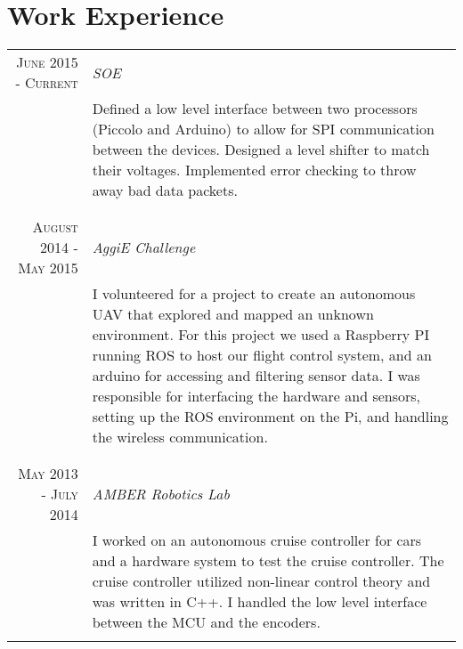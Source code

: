 \documentclass[a4paper,10pt]{article} %
\begin{document}
\section{Work Experience}

\begin{tabular}{r|p{11cm}}
\textsc{June 2015 - Current} & \emph{SOE}\\
& \footnotesize{Defined a low level interface between two processors (Piccolo and Arduino) to allow for SPI communication between the devices. Designed a level shifter to match their voltages. Implemented error checking to throw away bad data packets.}\\
\multicolumn{2}{c}{} \\
& \\

\textsc{August 2014 - May 2015} & \emph{AggiE Challenge}\\
& \footnotesize{I volunteered for a project to create an autonomous UAV that explored and mapped an unknown environment. For this project we used a Raspberry PI running ROS to host our flight control system, and an arduino for accessing and filtering sensor data. I was responsible for interfacing the hardware and sensors, setting up the ROS environment on the Pi, and handling the wireless communication.}\\
\multicolumn{2}{c}{} \\
& \\

\textsc{May 2013 - July 2014} & \emph{AMBER Robotics Lab}\\
& \footnotesize{I worked on an autonomous cruise controller for cars and a hardware system to test the cruise controller. The cruise controller utilized non-linear control theory and was written in C++. I handled the low level interface between the MCU and the encoders.}\\
\multicolumn{2}{c}{} \\

\end{tabular}




\end{document}
